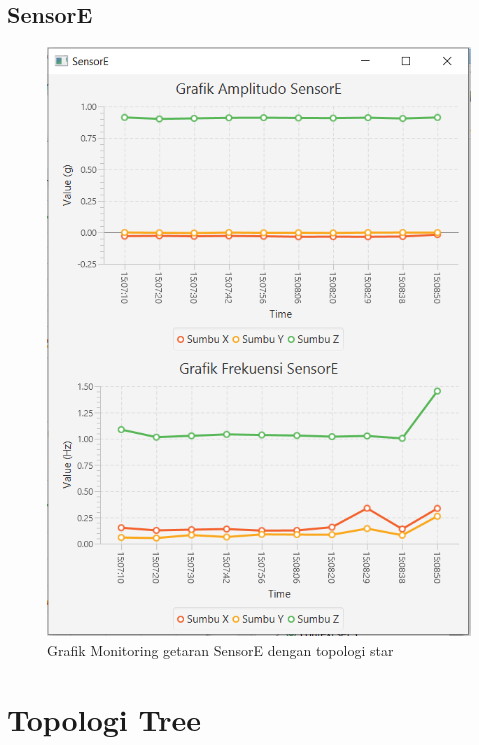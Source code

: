 \subsection{SensorE}
\begin{figure}[H] 
	\centering  
	\includegraphics[scale=1]{Lampiran/HasilPengujian/sensorE_star.PNG} 
	\caption[Grafik Monitoring getaran SensorE dengan topologi star]{Grafik Monitoring getaran SensorE dengan topologi star}
	\label{fig:grafik_E_star_paskal} 
\end{figure}

\section{Topologi Tree}

